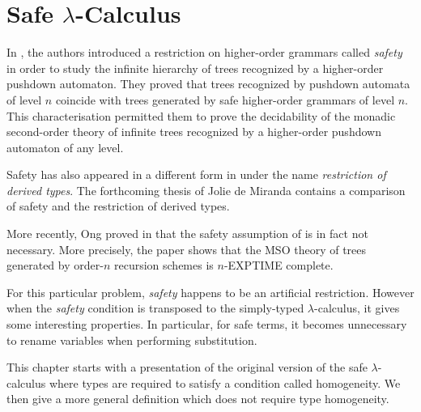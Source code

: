 \chapter{Safe $\lambda$-Calculus}
In \cite{KNU02}, the authors introduced a restriction on
higher-order grammars called \emph{safety} in order to study the
infinite hierarchy of trees recognized by a higher-order pushdown
automaton. They proved that trees recognized by pushdown automata of
level $n$ coincide with trees generated by safe higher-order
grammars of level $n$. This characterisation permitted them to prove
the decidability of the monadic second-order theory of infinite
trees recognized by a higher-order pushdown automaton of any level.

Safety has also appeared in a different form in \cite{Dam82} under
the name \emph{restriction of derived types}. The forthcoming thesis
of Jolie de Miranda \citep{demirandathesis} contains a comparison of
safety and the restriction of derived types.

More recently, Ong proved in \cite{OngLics2006} that the safety
assumption of \cite{KNU02} is in fact not necessary. More precisely,
the paper shows that the MSO theory of trees generated by order-$n$
recursion schemes is $n$-EXPTIME complete.

For this particular problem, \emph{safety} happens to be an
artificial restriction. However when the \emph{safety} condition is
transposed to the simply-typed $\lambda$-calculus, it gives some
interesting properties. In particular, for safe terms, it becomes
unnecessary to rename variables when performing substitution.

This chapter starts with a presentation of the original version of
the safe $\lambda$-calculus where types are required to satisfy a
condition called homogeneity. We then give a more general definition
which does not require type homogeneity.
